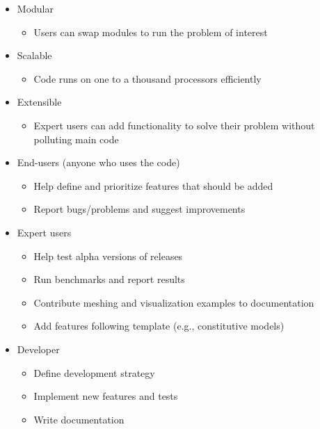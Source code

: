 \documentclass[pdftex,cig,slideColor]{pp4slides}
\begin{document}
  
  \begin{itemize}
  \item Modular
    \begin{itemize}
    \item Users can swap modules to run the problem of interest
    \end{itemize}
  \item Scalable
    \begin{itemize}
    \item Code runs on one to a thousand processors efficiently
    \end{itemize}    
  \item Extensible
    \begin{itemize}
    \item Expert users can add functionality to solve their problem
      without polluting main code
    \end{itemize}
  \end{itemize}


  \begin{itemize}
  \item End-users (anyone who uses the code)
    \begin{itemize}
    \item Help define and prioritize features that should be added
    \item Report bugs/problems and suggest improvements
    \end{itemize}
  \item Expert users
    \begin{itemize}
    \item Help test alpha versions of releases
    \item Run benchmarks and report results
    \item Contribute meshing and visualization examples to documentation
    \item Add features following template (e.g., constitutive models)
    \end{itemize}
  \item Developer
    \begin{itemize}
    \item Define development strategy 
    \item Implement new features and tests
    \item Write documentation
    \end{itemize}
  \end{itemize}
\end{document}
